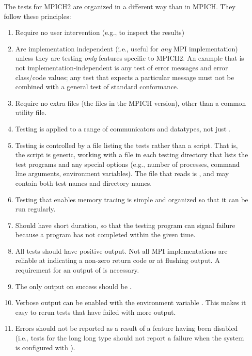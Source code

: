 \documentclass{article}
\begin{document}
The tests for MPICH2 are organized in a different way than in MPICH. They
follow these principles:
\begin{enumerate}
\item Require no user intervention (e.g., to inspect the results)
\item Are implementation independent (i.e., useful for
\emph{any} MPI implementation) unless they are testing \emph{only}
features specific to MPICH2.  An example that is not
implementation-independent is any test of error messages
and error class/code values; any test that expects a particular
message must not be combined with a general test of standard
conformance.
\item Require no extra files (the  files in the MPICH
version), other than a common utility file.
\item Testing is applied to a range of communicators and
datatypes, not just .  
\item Testing is controlled by a file listing the tests rather
than a script.  That is, the script  is generic,
working with a file in each testing directory that lists the test
programs and any special options (e.g., number of processes, command
line arguments, environment variables).  The file that 
reads is , and may contain both test names and
directory names.  
\item Testing that enables memory tracing is simple and
organized so that it can be run regularly.
\item Should have short duration, so that the testing program can
signal failure because a program has not completed within the given
time.
\item All tests should have positive output.  Not all MPI
implementations are reliable at indicating a non-zero return code or at
flushing output.  A requirement for an output of  is
necessary. 
\item The only output on success should be .
\item Verbose output can be enabled with the environment variable
  .  This makes 
  it easy to rerun tests that have failed with more output.
\item Errors should not be reported as a result of a feature
having been disabled (i.e., tests for the long long type should not
report a failure when the system is configured with
).
\end{enumerate}
\end{document}
